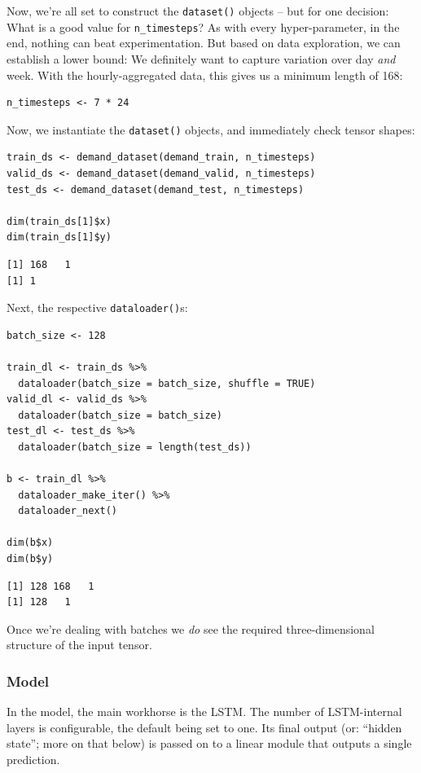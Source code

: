 \documentclass[
  letterpaper,
]{krantz}
\begin{document}
Now, we're all set to construct the \texttt{dataset()} objects -- but
for one decision: What is a good value for \texttt{n\_timesteps}? As
with every hyper-parameter, in the end, nothing can beat
experimentation. But based on data exploration, we can establish a lower
bound: We definitely want to capture variation over day \emph{and} week.
With the hourly-aggregated data, this gives us a minimum length of 168:

\begin{verbatim}
n_timesteps <- 7 * 24
\end{verbatim}

Now, we instantiate the \texttt{dataset()} objects, and immediately
check tensor shapes:

\begin{verbatim}
train_ds <- demand_dataset(demand_train, n_timesteps)
valid_ds <- demand_dataset(demand_valid, n_timesteps)
test_ds <- demand_dataset(demand_test, n_timesteps)

dim(train_ds[1]$x)
dim(train_ds[1]$y)
\end{verbatim}

\begin{verbatim}
[1] 168   1
[1] 1
\end{verbatim}

Next, the respective \texttt{dataloader()}s:

\begin{verbatim}
batch_size <- 128

train_dl <- train_ds %>%
  dataloader(batch_size = batch_size, shuffle = TRUE)
valid_dl <- valid_ds %>%
  dataloader(batch_size = batch_size)
test_dl <- test_ds %>%
  dataloader(batch_size = length(test_ds))

b <- train_dl %>%
  dataloader_make_iter() %>%
  dataloader_next()

dim(b$x)
dim(b$y)
\end{verbatim}

\begin{verbatim}
[1] 128 168   1
[1] 128   1
\end{verbatim}

Once we're dealing with batches we \emph{do} see the required
three-dimensional structure of the input tensor.

\hypertarget{model-1}{%
\subsubsection{Model}\label{model-1}}

In the model, the main workhorse is the LSTM. The number of
LSTM-internal layers is configurable, the default being set to one. Its
final output (or: ``hidden state''; more on that below) is passed on to
a linear module that outputs a single prediction.
\end{document}
